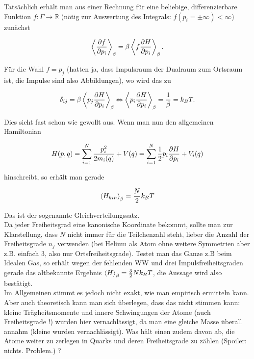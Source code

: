 Tatsächlich erhält man aus einer Rechnung für eine beliebige, differenzierbare Funktion $f: \Gamma \rightarrow \mathbb{R}$ (nötig zur Auswertung des Integrals: $f(p_i = \pm\infty) < \infty$) zunächst

\begin{equation}\label{key}
\expval{\pdv{f}{p_i}}_\beta = \beta \expval{f \pdv{H}{p_i}}_\beta .
\end{equation}

Für die Wahl $f = p_j$ (hatten ja, dass Impulsraum der Dualraum zum Ortsraum ist, die Impulse sind also Abbildungen), wo wird das zu

\begin{equation}\label{key}
\delta_{ij} = \beta \expval{p_j \pdv{H}{p_i}}_\beta \Leftrightarrow \expval{p_i \pdv{H}{p_i}}_\beta = \frac{1}{\beta} = k_B T .
\end{equation}

Dies sieht fast schon wie gewollt aus. Wenn man nun den allgemeinen Hamiltonian

\begin{equation}\label{key}
H(p,q) = \sum\limits_{i=1}^N \frac{p_i^2}{2 m_i(q)} + V(q) = \sum\limits_{i=1}^N \frac{1}{2} p_i \pdv{H}{p_i} + V_i(q)
\end{equation}

hinschreibt, so erhält man gerade

\begin{equation}\label{key}
\expval{H_{kin}}_\beta = \frac{N}{2} k_B T
\end{equation}

	\smallskip

Das ist der sogenannte Gleichverteilungssatz.\\

Da jeder Freiheitsgrad eine kanonische Koordinate bekommt, sollte man zur Klarstellung, dass $N$ nicht immer für die Teilchenzahl steht, lieber die Anzahl der Freiheitsgrade $n_f$ verwenden (bei Helium als Atom ohne weitere Symmetrien aber z.B. einfach 3, also nur Ortsfreiheitsgrade). Testet man das Ganze z.B beim Idealen Gas, so erhält wegen der fehlenden WW und drei Impulsfreiheitsgraden gerade das altbekannte Ergebnis $\expval{H}_\beta = \frac{3}{2} N k_B T$, die Aussage wird also bestätigt.\\
Im Allgemeinen stimmt es jedoch nicht exakt, wie man empirisch ermitteln kann. Aber auch theoretisch kann man sich überlegen, dass das nicht stimmen kann: kleine Trägheitsmomente und innere Schwingungen der Atome (auch Freiheitsgrade !) wurden hier vernachlässigt, da man eine gleiche Masse überall annahm (kleine wurden vernachlässigt). Was hält einen zudem davon ab, die Atome weiter zu zerlegen in Quarks und deren Freiheitsgrade zu zählen (Spoiler: nichts. Problem.) ?

